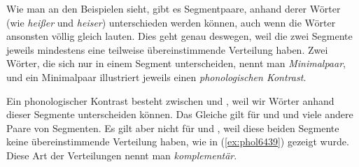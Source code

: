 \begin{exe}
  \ex\label{ex:phol6438}
    \begin{xlist}
    \end{xlist}
  \ex\label{ex:phol6440}
    \begin{xlist}
    \end{xlist}
\end{exe}

Wie man an den Beispielen sieht, gibt es Segmentpaare, anhand derer Wörter (wie \textit{heißer} und \textit{heiser}) unterschieden werden können, auch wenn die Wörter ansonsten völlig gleich lauten.
Dies geht genau deswegen, weil die zwei Segmente jeweils mindestens eine teilweise übereinstimmende Verteilung haben.
Zwei Wörter, die sich nur in einem Segment unterscheiden, nennt man \textit{Minimalpaar}, und ein Minimalpaar illustriert jeweils einen \textit{phonologischen Kontrast}.


Ein phonologischer Kontrast besteht \zB zwischen \textipa{[t]} und \textipa{[k]}, weil wir Wörter anhand dieser Segmente unterscheiden können.
Das Gleiche gilt für \textipa{[s]} und \textipa{[z]} und viele andere Paare von Segmenten.
Es gilt aber nicht für \textipa{[h]} und \textipa{[N]}, weil diese beiden Segmente keine übereinstimmende Verteilung haben, wie in (\ref{ex:phol6439}) gezeigt wurde.
Diese Art der Verteilungen nennt man \textit{komplementär}.


